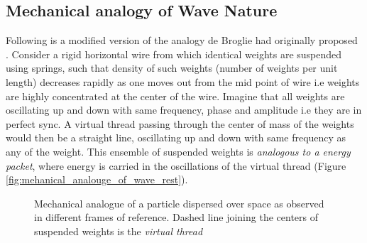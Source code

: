 \documentclass[11pt, a4paper]{article}
\newcommand{\quotedsingle}[1]{#1}	%
\newcommand{\quotedsingleit}[1]{\quotedsingle{\textit{#1}}}	%
\begin{document}
	\subsection{Mechanical analogy of Wave Nature} \label{sec:mechanical_analogy_to_wave_nature}
	Following is a modified version of the analogy de Broglie had originally proposed \cite{de_broglie_thesis}. Consider a rigid horizontal wire from which identical weights are suspended using springs, such that density of such weights (number of weights per unit length) decreases rapidly as one moves out from the mid point of wire i.e weights are highly concentrated at the center of the wire. Imagine that all weights are oscillating up and down with same frequency, phase and amplitude i.e they are in perfect sync. A virtual thread passing through the center of mass of the weights would then be a straight line, oscillating up and down with same frequency as any of the weight. This ensemble of suspended weights is \quotedsingleit{analogous to a energy packet}, where energy is carried in the oscillations of the virtual thread (Figure \ref{fig:mehanical_analouge_of_wave_rest}).
	\begin{figure}
		\centering
		
		
		
		\caption{Mechanical analogue of a particle dispersed over space as observed in different frames of reference. Dashed line joining the centers of suspended weights is the \quotedsingleit{virtual thread}}
		\label{fig:mehanical_analouge_of_wave}
	\end{figure}
\end{document}
